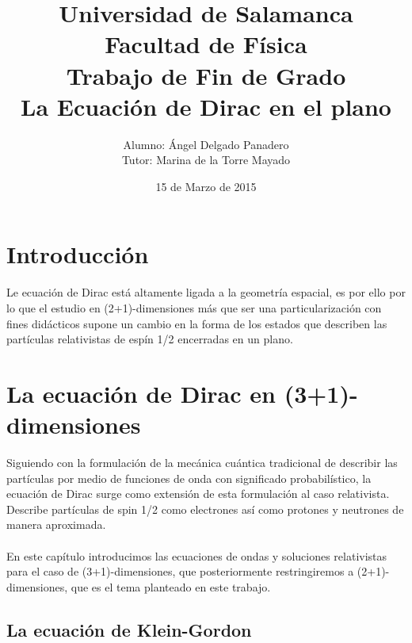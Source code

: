 \documentclass[11pt,letterpaper]{article}     %
\author{Alumno: Ángel Delgado Panadero \\  Tutor: Marina de la Torre Mayado \vspace*{1.0in}}
\title{Universidad de Salamanca\\{\small Facultad de Física}\\ {\small Trabajo de Fin de Grado}\vspace*{1.5in}\\ La Ecuación de Dirac en el plano\vspace*{3in}}
\date{15 de Marzo de 2015}
\begin{document}


\maketitle                          %

\thispagestyle{empty}
\tableofcontents

\newpage

\cfoot{\thepage}


\section{Introducción}




Le ecuación de Dirac está altamente ligada a la geometría espacial, es por ello por lo que el estudio en (2+1)-dimensiones más que ser una particularización con fines didácticos supone un cambio en la forma de los estados  que describen las partículas relativistas de espín 1/2 encerradas en un plano.




\section{La ecuación de Dirac en (3+1)-dimensiones}



Siguiendo con la formulación de la mecánica cuántica tradicional de describir las partículas por medio de funciones de onda con significado probabilístico, la ecuación de Dirac surge como extensión de esta formulación al caso relativista. Describe partículas de spin 1/2 como electrones así como protones y neutrones de manera aproximada.\\ \\
En este capítulo introducimos las ecuaciones de ondas y soluciones relativistas para el caso de (3+1)-dimensiones, que posteriormente restringiremos a (2+1)-dimensiones, que es el tema planteado en este trabajo.




\subsection{La ecuación de Klein-Gordon}
\end{document}
